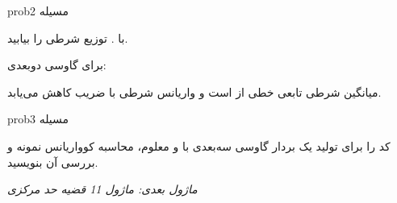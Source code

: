 \begin{PSbox}[unbreakable]{prob}{مسیله 2}

 با . توزیع شرطی  را بیابید.

\PSsolution{} برای گاوسی دوبعدی:\PSbr{}\PSbr{}

میانگین شرطی تابعی خطی از  است و واریانس شرطی با ضریب  کاهش می‌یابد.

\end{PSbox}

\begin{PSbox}[unbreakable]{prob}{مسیله 3}

کد  را برای تولید یک بردار گاوسی سه‌بعدی با \lr{$\mu$} و \lr{$\Sigma$} معلوم، محاسبه کوواریانس نمونه و بررسی آن بنویسید.

\PSsolution{} 


\begin{Shaded}
\begin{Highlighting}[]
 \OperatorTok{=}\NormalTok{ [}\OperatorTok{;} \OperatorTok{;} \OperatorTok{{-}}\NormalTok{]}\OperatorTok{;}
 \OperatorTok{=}\NormalTok{ [}  \OperatorTok{;}   \OperatorTok{{-}}\OperatorTok{;}  \OperatorTok{{-}} \NormalTok{]}\OperatorTok{;}
 \OperatorTok{=} \OperatorTok{;}
 \OperatorTok{=} \NormalTok{(}\OperatorTok{\textquotesingle{},} \OperatorTok{,} \NormalTok{)}\OperatorTok{;}
\NormalTok{(}\NormalTok{)}\OperatorTok{;} \NormalTok{(}\NormalTok{(}\NormalTok{)}\OperatorTok{\textquotesingle{}}\NormalTok{)}\OperatorTok{;}
\NormalTok{(}\NormalTok{)}\OperatorTok{;} \NormalTok{(}\NormalTok{(}\NormalTok{))}\OperatorTok{;}
\end{Highlighting}
\end{Shaded}

\emph{ماژول بعدی: {ماژول 11  قضیه حد مرکزی}}

\end{PSbox}
